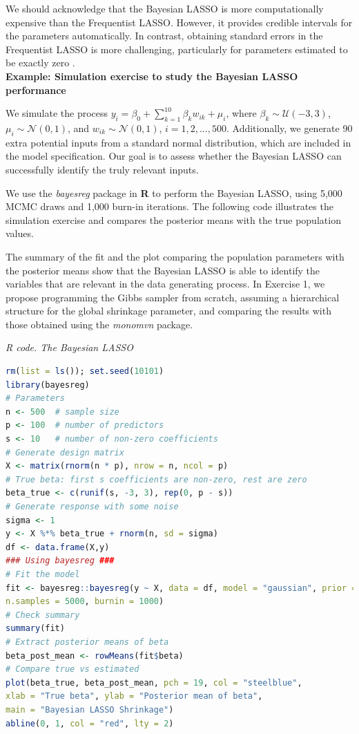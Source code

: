 We should acknowledge that the Bayesian LASSO is more computationally expensive than the Frequentist LASSO. However, it provides credible intervals for the parameters automatically. In contrast, obtaining standard errors in the Frequentist LASSO is more challenging, particularly for parameters estimated to be exactly zero \cite{kyung2010penalized}.\\

\textbf{Example: Simulation exercise to study the Bayesian LASSO performance}

We simulate the process \( y_i = \beta_0 + \sum_{k=1}^{10} \beta_k w_{ik}  + \mu_i \), where \( \beta_k \sim \mathcal{U}(-3, 3) \), \( \mu_i \sim \mathcal{N}(0, 1) \), and \( w_{ik} \sim \mathcal{N}(0, 1) \), $i=1,2,\dots,500$. Additionally, we generate 90 extra potential inputs from a standard normal distribution, which are included in the model specification. Our goal is to assess whether the Bayesian LASSO can successfully identify the truly relevant inputs.

We use the \textit{bayesreg} package in \textbf{R} to perform the Bayesian LASSO, using 5,000 MCMC draws and 1,000 burn-in iterations. The following code illustrates the simulation exercise and compares the posterior means with the true population values.

The summary of the fit and the plot comparing the population parameters with the posterior means show that the Bayesian LASSO is able to identify the variables that are relevant in the data generating process. In Exercise 1, we propose programming the Gibbs sampler from scratch, assuming a hierarchical structure for the global shrinkage parameter, and comparing the results with those obtained using the \textit{monomvn} package.

\begin{tcolorbox}[enhanced,width=4.67in,center upper,
	fontupper=\large\bfseries,drop shadow southwest,sharp corners]
	\textit{R code. The Bayesian LASSO}
	\begin{VF}
		\begin{lstlisting}[language=R]
rm(list = ls()); set.seed(10101)
library(bayesreg)
# Parameters
n <- 500  # sample size
p <- 100  # number of predictors
s <- 10   # number of non-zero coefficients
# Generate design matrix
X <- matrix(rnorm(n * p), nrow = n, ncol = p)
# True beta: first s coefficients are non-zero, rest are zero
beta_true <- c(runif(s, -3, 3), rep(0, p - s))
# Generate response with some noise
sigma <- 1
y <- X %*% beta_true + rnorm(n, sd = sigma)
df <- data.frame(X,y)
### Using bayesreg ###
# Fit the model
fit <- bayesreg::bayesreg(y ~ X, data = df, model = "gaussian", prior = "lasso", 
n.samples = 5000, burnin = 1000)
# Check summary
summary(fit)
# Extract posterior means of beta
beta_post_mean <- rowMeans(fit$beta)
# Compare true vs estimated
plot(beta_true, beta_post_mean, pch = 19, col = "steelblue",
xlab = "True beta", ylab = "Posterior mean of beta",
main = "Bayesian LASSO Shrinkage")
abline(0, 1, col = "red", lty = 2)
\end{lstlisting}
	\end{VF}
\end{tcolorbox}
  

